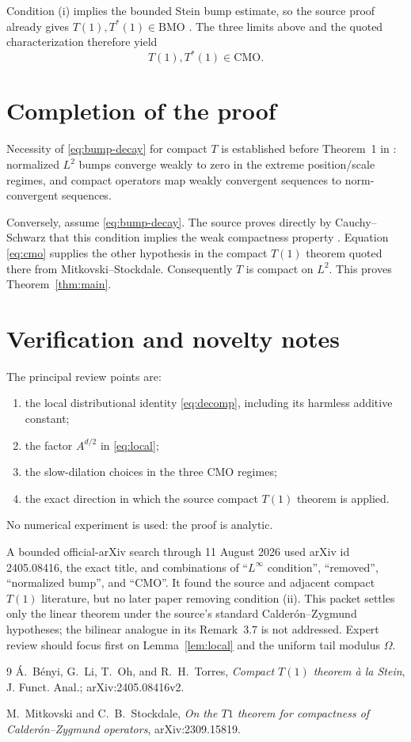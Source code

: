 \documentclass[11pt]{article}
\newcommand{\BMO}{\mathrm{BMO}}
\newcommand{\CMO}{\mathrm{CMO}}
\begin{document}
Condition (i) implies the bounded Stein bump estimate, so the source proof
already gives $T(1),T^*(1)\in\BMO$ \cite[Section~4]{BLOT}.  The three
limits above and the quoted characterization therefore yield
\begin{equation}\label{eq:cmo}
 T(1),T^*(1)\in\CMO.
\end{equation}

\section{Completion of the proof}

Necessity of \eqref{eq:bump-decay} for compact $T$ is established before
Theorem~1 in \cite{BLOT}: normalized $L^2$ bumps converge weakly to zero in
the extreme position/scale regimes, and compact operators map weakly
convergent sequences to norm-convergent sequences.

Conversely, assume \eqref{eq:bump-decay}.  The source proves directly by
Cauchy--Schwarz that this condition implies the weak compactness property
\cite[Section~4]{BLOT}.  Equation \eqref{eq:cmo} supplies the other
hypothesis in the compact $T(1)$ theorem quoted there from
Mitkovski--Stockdale.  Consequently $T$ is compact on $L^2$.  This proves
Theorem~\ref{thm:main}.

\section{Verification and novelty notes}

The principal review points are:
\begin{enumerate}
\item the local distributional identity \eqref{eq:decomp}, including its
harmless additive constant;
\item the factor $A^{d/2}$ in \eqref{eq:local};
\item the slow-dilation choices in the three CMO regimes;
\item the exact direction in which the source compact $T(1)$ theorem is
applied.
\end{enumerate}
No numerical experiment is used: the proof is analytic.

A bounded official-arXiv search through 11 August 2026 used arXiv id
2405.08416, the exact title, and combinations of ``$L^\infty$ condition'',
``removed'', ``normalized bump'', and ``CMO''.  It found the source and
adjacent compact $T(1)$ literature, but no later paper removing condition
(ii).  This packet settles only the linear theorem under the source's
standard Calder\'on--Zygmund hypotheses; the bilinear analogue in its
Remark~3.7 is not addressed.  Expert review should focus first on
Lemma~\ref{lem:local} and the uniform tail modulus $\Omega$.

\begin{thebibliography}{9}
\'A.~B\'enyi, G.~Li, T.~Oh, and R.~H.~Torres,
\emph{Compact $T(1)$ theorem \`a la Stein},
J. Funct. Anal.; arXiv:2405.08416v2.

M.~Mitkovski and C.~B.~Stockdale,
\emph{On the $T1$ theorem for compactness of Calder\'on--Zygmund operators},
arXiv:2309.15819.
\end{thebibliography}
\end{document}
